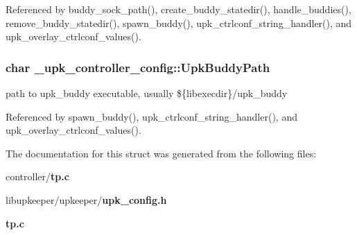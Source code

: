 Referenced by buddy\_\-sock\_\-path(), create\_\-buddy\_\-statedir(), handle\_\-buddies(), remove\_\-buddy\_\-statedir(), spawn\_\-buddy(), upk\_\-ctrlconf\_\-string\_\-handler(), and upk\_\-overlay\_\-ctrlconf\_\-values().

\subsubsection[{UpkBuddyPath}]{\setlength{\rightskip}{0pt plus 5cm}char {\bf \_\-upk\_\-controller\_\-config::UpkBuddyPath}}\label{struct__upk__controller__config_ae75c315649537bf9813bd7fe8cca3b4c}
path to upk\_\-buddy executable, usually \$\{libexecdir\}/upk\_\-buddy 

Referenced by spawn\_\-buddy(), upk\_\-ctrlconf\_\-string\_\-handler(), and upk\_\-overlay\_\-ctrlconf\_\-values().



The documentation for this struct was generated from the following files:\begin{DoxyCompactItemize}
\item 
controller/{\bf tp.c}\item 
libupkeeper/upkeeper/{\bf upk\_\-config.h}\item 
{\bf tp.c}\end{DoxyCompactItemize}
